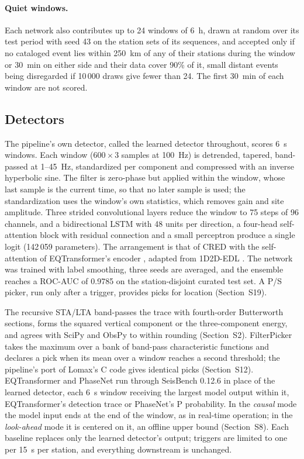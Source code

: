 \documentclass[a4paper,fleqn]{cas-sc}
\newcommand{\stalta}{STA/LTA}
\begin{document}
\paragraph{Quiet windows.} Each network also contributes up to 24 windows of 6~h,
drawn at random over its test period with seed 43 on the station sets of its
sequences, and accepted only if no cataloged event lies within 250~km of any of
their stations during the window or 30~min on either side and their data cover 90\%
of it, small distant events being disregarded if 10\,000 draws give fewer than 24.
The first 30~min of each window are not scored.

\subsection{Detectors}\label{sec:detectors}

The pipeline's own detector, called the learned detector throughout, scores 6~s
windows. Each window ($600 \times 3$ samples at 100~Hz) is detrended, tapered,
band-passed at 1--45~Hz, standardized per component and compressed with an inverse
hyperbolic sine. The filter is zero-phase but applied within the window, whose last
sample is the current time, so that no later sample is used; the standardization uses
the window's own statistics, which removes gain and site amplitude. Three strided convolutional layers reduce
the window to 75 steps of 96 channels, and a bidirectional LSTM with 48 units per
direction, a four-head self-attention block with residual connection
\citep{vaswani2017} and a small perceptron produce a single logit (142\,059
parameters). The arrangement is that of CRED \citep{mousavi2019cred} with the self-attention of
EQTransformer's encoder \citep{mousavi2020eqt}, adapted from 1D2D-EDL
\citep{wang2025}. The network was trained with label smoothing, three seeds are averaged, and the
ensemble reaches a ROC-AUC of 0.9785 on the station-disjoint curated test set. A P/S
picker, run only after a trigger, provides picks for location (Section~S19).

The recursive \stalta{} band-passes the trace with fourth-order Butterworth sections,
forms the squared vertical component or the three-component energy, and agrees with
SciPy \citep{virtanen2020} and ObsPy \citep{beyreuther2010,krischer2015} to within
rounding (Section~S2). FilterPicker takes the maximum over a bank of band-pass characteristic functions
and declares a pick when its mean over a window reaches a second threshold; the
pipeline's port of Lomax's C code gives identical picks (Section~S12). EQTransformer and
PhaseNet run through SeisBench 0.12.6 in place of the learned detector, each 6~s window
receiving the largest model output within it, EQTransformer's detection trace or
PhaseNet's P probability. In the \emph{causal} mode the model input ends at the end
of the window, as in real-time operation; in the \emph{look-ahead} mode it is
centered on it, an offline upper bound (Section~S8). Each baseline replaces only the learned detector's output;
triggers are limited to one per 15~s per station, and everything downstream is
unchanged.
\end{document}
